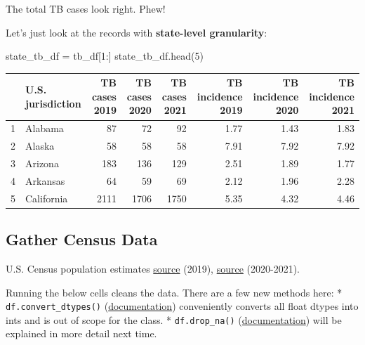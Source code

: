 \documentclass[
  letterpaper,
  DIV=11,
  numbers=noendperiod]{scrreprt}
\newenvironment{Shaded}{\begin{snugshade}}{\end{snugshade}}
\newcommand{\DecValTok}[1]{\textcolor[rgb]{0.68,0.00,0.00}{#1}}
\newcommand{\NormalTok}[1]{\textcolor[rgb]{0.00,0.23,0.31}{#1}}
\newcommand{\OperatorTok}[1]{\textcolor[rgb]{0.37,0.37,0.37}{#1}}
\begin{document}
The total TB cases look right. Phew!

Let's just look at the records with \textbf{state-level granularity}:

\begin{Shaded}
\begin{Highlighting}[]
\NormalTok{state\_tb\_df }\OperatorTok{=}\NormalTok{ tb\_df[}\DecValTok{1}\NormalTok{:]}
\NormalTok{state\_tb\_df.head(}\DecValTok{5}\NormalTok{)}
\end{Highlighting}
\end{Shaded}

\begin{tabular}{llrrrrrr}
\toprule
{} & U.S. jurisdiction &  TB cases 2019 &  TB cases 2020 &  TB cases 2021 &  TB incidence 2019 &  TB incidence 2020 &  TB incidence 2021 \\
\midrule
1 &           Alabama &             87 &             72 &             92 &               1.77 &               1.43 &               1.83 \\
2 &            Alaska &             58 &             58 &             58 &               7.91 &               7.92 &               7.92 \\
3 &           Arizona &            183 &            136 &            129 &               2.51 &               1.89 &               1.77 \\
4 &          Arkansas &             64 &             59 &             69 &               2.12 &               1.96 &               2.28 \\
5 &        California &           2111 &           1706 &           1750 &               5.35 &               4.32 &               4.46 \\
\bottomrule
\end{tabular}

\hypertarget{gather-census-data}{%
\subsection{Gather Census Data}\label{gather-census-data}}

U.S. Census population estimates
\href{https://www.census.gov/data/tables/time-series/demo/popest/2010s-state-total.html}{source}
(2019),
\href{https://www.census.gov/data/tables/time-series/demo/popest/2020s-state-total.html}{source}
(2020-2021).

Running the below cells cleans the data. There are a few new methods
here: * \texttt{df.convert\_dtypes()}
(\href{https://pandas.pydata.org/docs/reference/api/pandas.DataFrame.convert_dtypes.html}{documentation})
conveniently converts all float dtypes into ints and is out of scope for
the class. * \texttt{df.drop\_na()}
(\href{https://pandas.pydata.org/docs/reference/api/pandas.DataFrame.dropna.html}{documentation})
will be explained in more detail next time.
\end{document}

